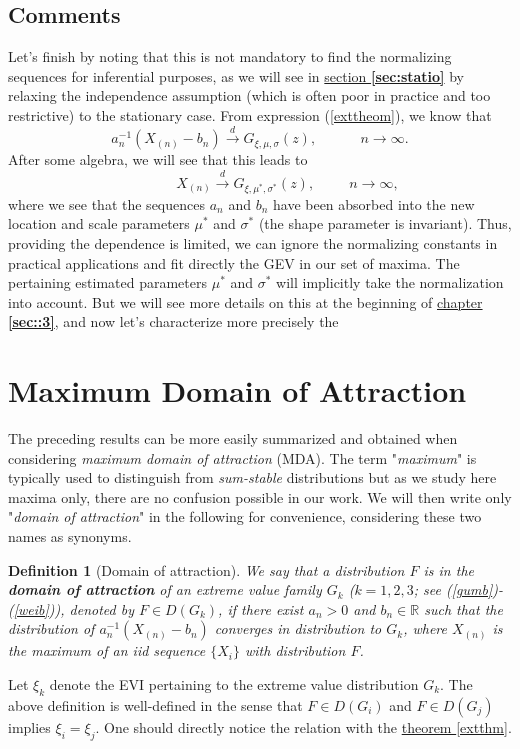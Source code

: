 \documentclass[11pt,a4paper,openany ]{book}
\newtheorem{definition}{Definition}[chapter]
\newcommand*{\QEDB}{\hfill\ensuremath{\triangle}}%
\begin{document}
\subsection*{Comments}
Let's finish by noting that this is not mandatory to find the normalizing sequences for inferential purposes, as we will see in \hyperref[sec:statio]{section \textbf{\ref{sec:statio}}} by relaxing the independence assumption (which is often poor in practice and too restrictive) to the stationary case. From expression (\ref{exttheom}), we know that
\begin{equation} \label{convseq1}
a_n^{-1}(X_{(n)}-b_n)\stackrel{d}{\longrightarrow} G_{\xi,\mu,\sigma}(z), \ \ \ \ \qquad \ n\rightarrow\infty.
\end{equation}
After some algebra, we will see that this leads to 
\begin{equation}\label{convseq2}
\qquad \quad \quad X_{(n)}\stackrel{d}{\longrightarrow} G_{\xi,\mu^*,\sigma^*}(z), \  \quad \quad \ n\rightarrow\infty,
\end{equation}
where we see that the sequences $a_n$ and $b_n$ have been absorbed into the new location and scale parameters $\mu^*$ and $\sigma^*$ (the shape parameter is invariant). Thus, providing the dependence is limited, we can ignore the normalizing constants in practical applications and fit directly the GEV in our set of maxima.
The pertaining estimated parameters $\mu^*$ and $\sigma^*$ will implicitly take the normalization into account. But we will see more details on this at the beginning of \hyperref[sec::3]{chapter \textbf{\ref{sec::3}}}, and now let's characterize more precisely the 

\section{Maximum Domain of Attraction}\label{sec:mda}

The preceding results can be more easily summarized and obtained when considering \emph{maximum domain of attraction} (MDA). The term "\emph{maximum}" is typically used to distinguish from \emph{sum-stable} distributions but as we study here maxima only, there are no confusion possible in our work. We will then write only "\emph{domain of attraction}" in the following for convenience, considering these two names as synonyms.

\begin{definition}[Domain of attraction] We say that a distribution $F$ is in the \emph{\textbf{domain of attraction}} of an extreme value family $G_k$ \big($k=1,2,3$; see (\ref{gumb})-(\ref{weib})\big), denoted by $F\in D(G_k)$, if there exist $a_n>0$ and $b_n\in\mathbb{R}$ such that the distribution of $a_n^{-1}(X_{(n)}-b_n)$ converges in distribution to $G_k$, where $X_{(n)}$ is the maximum of an iid sequence $\{X_i\}$ with distribution $F$. %
\end{definition}
Let $\xi_k$ denote the EVI pertaining to the extreme value distribution $G_k$. The above definition is well-defined in the sense that $F\in D(G_i)$ and $F\in D(G_j)$ implies $\xi_i=\xi_j$. One should directly notice the relation with the \hyperref[extthm]{theorem \ref{extthm}}.
\end{document}
